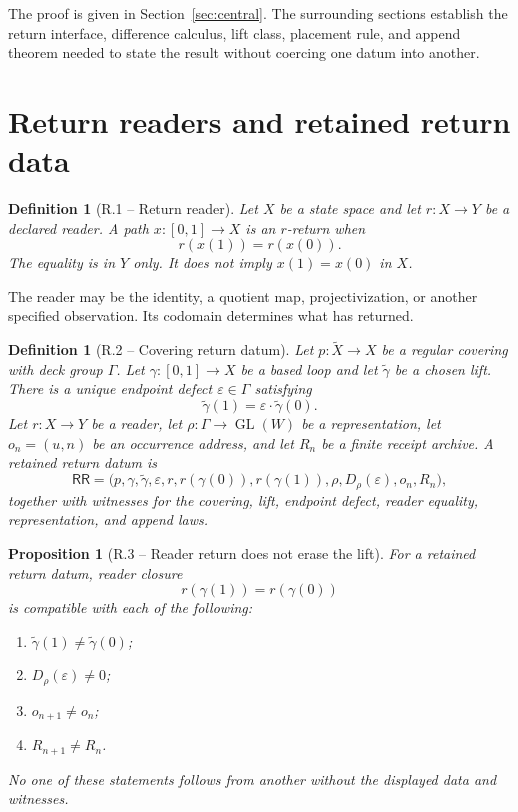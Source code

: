 \documentclass[11pt,letterpaper]{article}
\theoremstyle{returnstyle}
\newtheorem{proposition}[theorem]{Proposition}
\newtheorem{definition}[theorem]{Definition}
\newcommand{\GL}{\operatorname{GL}}
\newcommand{\RR}{\mathsf{RR}}
\begin{document}
The proof is given in Section~\ref{sec:central}.  The surrounding sections establish the return interface, difference calculus, lift class, placement rule, and append theorem needed to state the result without coercing one datum into another.

\section{Return readers and retained return data}\label{sec:return-data}

\begin{definition}[R.1 -- Return reader]
Let $X$ be a state space and let $r:X\to Y$ be a declared reader.  A path $x:[0,1]\to X$ is an $r$-return when
\[
r(x(1))=r(x(0)).
\]
The equality is in $Y$ only.  It does not imply $x(1)=x(0)$ in $X$.
\end{definition}

The reader may be the identity, a quotient map, projectivization, or another specified observation.  Its codomain determines what has returned.

\begin{definition}[R.2 -- Covering return datum]\label{def:rr}
Let $p:\widetilde X\to X$ be a regular covering with deck group $\Gamma$.  Let $\gamma:[0,1]\to X$ be a based loop and let $\widetilde\gamma$ be a chosen lift.  There is a unique endpoint defect $\varepsilon\in\Gamma$ satisfying
\[
\widetilde\gamma(1)=\varepsilon\cdot\widetilde\gamma(0).
\]
Let $r:X\to Y$ be a reader, let $\rho:\Gamma\to\GL(W)$ be a representation, let $o_n=(u,n)$ be an occurrence address, and let $R_n$ be a finite receipt archive.  A \emph{retained return datum} is
\[
\RR=
\bigl(
 p,\gamma,\widetilde\gamma,\varepsilon,
 r,r(\gamma(0)),r(\gamma(1)),
 \rho,D_\rho(\varepsilon),o_n,R_n
\bigr),
\]
together with witnesses for the covering, lift, endpoint defect, reader equality, representation, and append laws.
\end{definition}

\begin{proposition}[R.3 -- Reader return does not erase the lift]\label{prop:reader-return}
For a retained return datum, reader closure
\[
r(\gamma(1))=r(\gamma(0))
\]
is compatible with each of the following:
\begin{enumerate}
  \item $\widetilde\gamma(1)\ne\widetilde\gamma(0)$;
  \item $D_\rho(\varepsilon)\ne0$;
  \item $o_{n+1}\ne o_n$;
  \item $R_{n+1}\ne R_n$.
\end{enumerate}
No one of these statements follows from another without the displayed data and witnesses.
\end{proposition}
\end{document}
